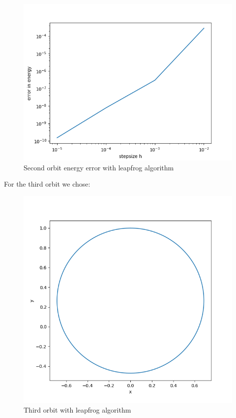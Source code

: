 \documentclass[11pt, a4paper, reqno]{scrartcl}
\begin{document}
    		\begin{figure}[H]
    			\includegraphics[width=.5\paperwidth]{figure_leap_2_2.png}
    			\caption{Second orbit energy error with leapfrog algorithm}
    		\end{figure}
    		
    		For the third orbit we chose:
    		\begin{figure}[H]
        		   
    		\end{figure}
    		
    		\begin{figure}[H]
    			\includegraphics[width=.5\paperwidth]{figure_leap_3.png}
    			\caption{Third orbit with leapfrog algorithm}
    		\end{figure}
    		
\end{document}

